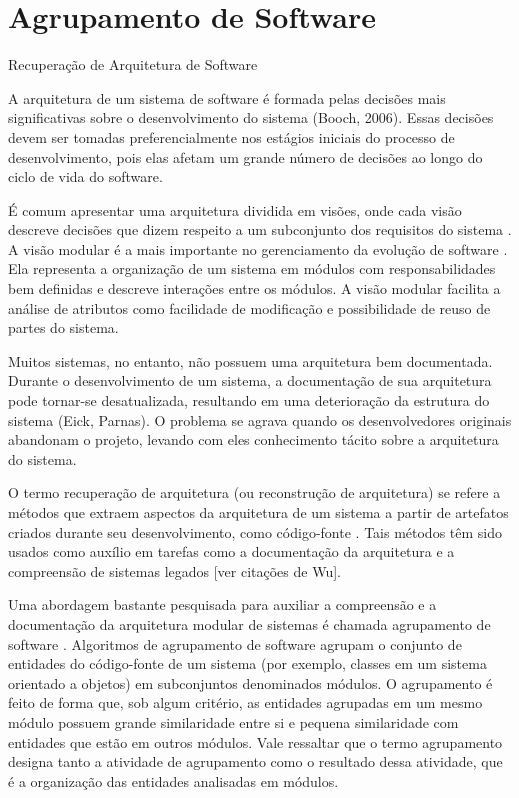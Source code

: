 %
% 

\chapter{Agrupamento de Software}

\begin{section}{Recuperação de Arquitetura de Software}

A arquitetura de um sistema de software é formada pelas decisões mais significativas sobre o desenvolvimento do sistema (Booch, 2006). Essas decisões devem ser tomadas preferencialmente nos estágios iniciais do processo de desenvolvimento, pois elas afetam um grande número de decisões ao longo do ciclo de vida do software.

É comum apresentar uma arquitetura dividida em visões, onde cada visão descreve decisões que dizem respeito a um subconjunto dos requisitos do sistema \cite{Clements2002}. A visão modular é a mais importante no gerenciamento da evolução de software \cite{Parnas1972}. Ela representa a organização de um sistema em módulos com responsabilidades bem definidas e descreve interações entre os módulos. A visão modular facilita a análise de atributos como facilidade de modificação e possibilidade de reuso de partes do sistema.

Muitos sistemas, no entanto, não possuem uma arquitetura bem documentada. Durante o desenvolvimento de um sistema, a documentação de sua arquitetura pode tornar-se desatualizada, resultando em uma deterioração da estrutura do sistema (Eick, Parnas). O problema se agrava quando os desenvolvedores originais abandonam o projeto, levando com eles conhecimento tácito sobre a arquitetura do sistema.

O termo recuperação de arquitetura (ou reconstrução de arquitetura) se refere a métodos que extraem aspectos da arquitetura de um sistema a partir de artefatos criados durante seu desenvolvimento, como código-fonte \cite{Pollet2007}. Tais métodos têm sido usados como auxílio em tarefas como a documentação da arquitetura e a compreensão de sistemas legados [ver citações de Wu].

Uma abordagem bastante pesquisada para auxiliar a compreensão e a documentação da arquitetura modular de sistemas é chamada agrupamento de software \cite{Mancoridis1998,Andritsos2005,Maqbool2007}. Algoritmos de agrupamento de software agrupam o conjunto de entidades do código-fonte de um sistema (por exemplo, classes em um sistema orientado a objetos) em subconjuntos denominados módulos. O agrupamento é feito de forma que, sob algum critério, as entidades agrupadas em um mesmo módulo possuem grande similaridade entre si e pequena similaridade com entidades que estão em outros módulos. Vale ressaltar que o termo agrupamento designa tanto a atividade de agrupamento como o resultado dessa atividade, que é a organização das entidades analisadas em módulos.


\end{section}

